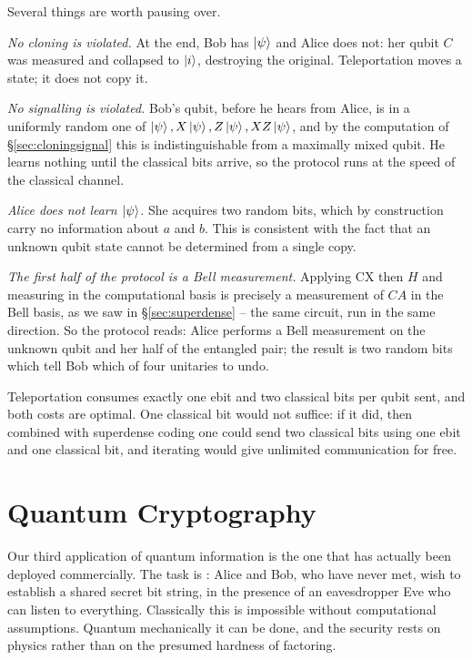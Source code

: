 \documentclass[a4paper]{scrartcl}
\newcommand{\CX}{\mathrm{CX}}
\begin{document}
Several things are worth pausing over.

\emph{No cloning is violated.} At the end, Bob has $\ket{\psi}$ and Alice does not: her qubit $C$ was measured and collapsed to $\ket{i}$, destroying the original. Teleportation moves a state; it does not copy it.

\emph{No signalling is violated.} Bob's qubit, before he hears from Alice, is in a uniformly random one of $\ket{\psi}, X\ket{\psi}, Z\ket{\psi}, XZ\ket{\psi}$, and by the computation of \S\ref{sec:cloningsignal} this is indistinguishable from a maximally mixed qubit. He learns nothing until the classical bits arrive, so the protocol runs at the speed of the classical channel.

\emph{Alice does not learn $\ket{\psi}$.} She acquires two random bits, which by construction carry no information about $a$ and $b$. This is consistent with the fact that an unknown qubit state cannot be determined from a single copy.

\emph{The first half of the protocol is a Bell measurement.} Applying $\CX$ then $H$ and measuring in the computational basis is precisely a measurement of $CA$ in the Bell basis, as we saw in \S\ref{sec:superdense} -- the same circuit, run in the same direction. So the protocol reads: Alice performs a Bell measurement on the unknown qubit and her half of the entangled pair; the result is two random bits which tell Bob which of four unitaries to undo.

\begin{remark}
	Teleportation consumes exactly one ebit and two classical bits per qubit sent, and both costs are optimal. One classical bit would not suffice: if it did, then combined with superdense coding one could send two classical bits using one ebit and one classical bit, and iterating would give unlimited communication for free.
\end{remark}

\section{Quantum Cryptography}\label{qic-sec:crypto}

Our third application of quantum information is the one that has actually been deployed commercially. The task is : Alice and Bob, who have never met, wish to establish a shared secret bit string, in the presence of an eavesdropper Eve who can listen to everything. Classically this is impossible without computational assumptions. Quantum mechanically it can be done, and the security rests on physics rather than on the presumed hardness of factoring.
\end{document}
